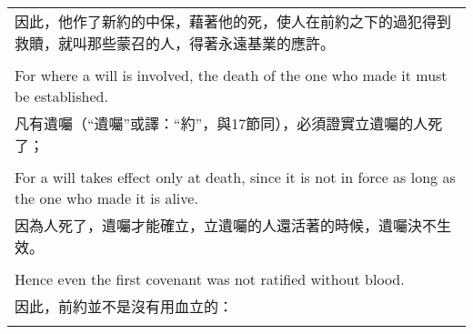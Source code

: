 \documentclass{book}
\begin{document}
\begin{tabularx}{\textwidth}{p{}}
因此，他作了新約的中保，藉著他的死，使人在前約之下的過犯得到救贖，就叫那些蒙召的人，得著永遠基業的應許。 \\ \\
For where a will is involved, the death of the one who made it must be established. \\
凡有遺囑（“遺囑”或譯：“約”，與17節同），必須證實立遺囑的人死了； \\ \\
For a will takes effect only at death, since it is not in force as long as the one who made it is alive. \\
因為人死了，遺囑才能確立，立遺囑的人還活著的時候，遺囑決不生效。 \\ \\
Hence even the first covenant was not ratified without blood. \\
因此，前約並不是沒有用血立的： \\ \\

\hline
\end{tabularx}
\end{document}
